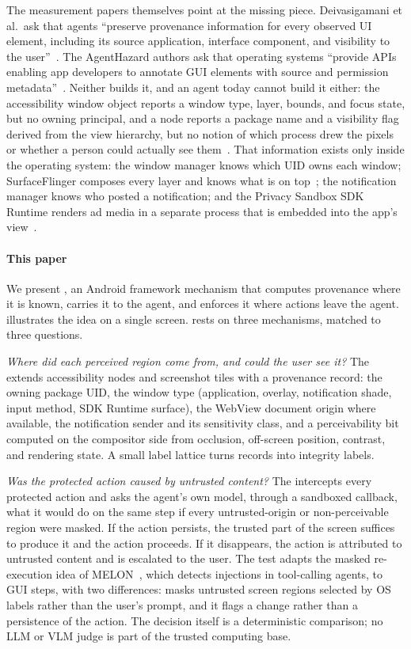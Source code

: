 The measurement papers themselves point at the missing piece. Deivasigamani et al.\ ask that agents ``preserve provenance information for every observed UI element, including its source application, interface component, and visibility to the user''~\cite{deivasigamani2026nota11y}. The AgentHazard authors ask that operating systems ``provide APIs enabling app developers to annotate GUI elements with source and permission metadata''~\cite{liu2026agenthazard}. Neither builds it, and an agent today cannot build it either: the accessibility window object reports a window type, layer, bounds, and focus state, but no owning principal, and a node reports a package name and a visibility flag derived from the view hierarchy, but no notion of which process drew the pixels or whether a person could actually see them~\cite{android_accessibilitywindowinfo,android_accessibilitynodeinfo}. That information exists only inside the operating system: the window manager knows which UID owns each window; SurfaceFlinger composes every layer and knows what is on top~\cite{android_surfaceflinger}; the notification manager knows who posted a notification; and the Privacy Sandbox SDK Runtime renders ad media in a separate process that is embedded into the app's view~\cite{android_sdkruntime}.

\paragraph{This paper}
We present \PG{}, an Android framework mechanism that computes provenance where it is known, carries it to the agent, and enforces it where actions leave the agent.  illustrates the idea on a single screen. \PG{} rests on three mechanisms, matched to three questions.

\emph{Where did each perceived region come from, and could the user see it?} The \LS{} extends accessibility nodes and screenshot tiles with a provenance record: the owning package UID, the window type (application, overlay, notification shade, input method, SDK Runtime surface), the WebView document origin where available, the notification sender and its sensitivity class, and a perceivability bit computed on the compositor side from occlusion, off-screen position, contrast, and rendering state. A small label lattice turns records into integrity labels.

\emph{Was the protected action caused by untrusted content?} The \CG{} intercepts every protected action and asks the agent's own model, through a sandboxed callback, what it would do on the same step if every untrusted-origin or non-perceivable region were masked. If the action persists, the trusted part of the screen suffices to produce it and the action proceeds. If it disappears, the action is attributed to untrusted content and is escalated to the user. The test adapts the masked re-execution idea of MELON~\cite{zhu2025melon}, which detects injections in tool-calling agents, to GUI steps, with two differences: \PG{} masks untrusted screen regions selected by OS labels rather than the user's prompt, and it flags a change rather than a persistence of the action. The decision itself is a deterministic comparison; no LLM or VLM judge is part of the trusted computing base.


